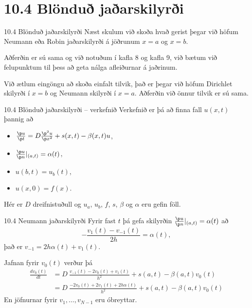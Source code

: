   
  \section*{10.4 Blönduð jaðarskilyrði}
  \begin{frame}{10.4 Blönduð jaðarskilyrði}
   Næst skulum við skoða hvað gerist þegar við höfum Neumann eða
   Robin jaðarskilyrði á jöðrunum $x=a$ og $x=b$.
   \pause
   \medskip
   
   Aðferðin er sú sama og við notuðum í kafla 8 og kafla 9, við bætum
   við felupunktum til þess að geta nálga afleiðurnar á jaðrinum.
   \pause
   \medskip
   
   Við ætlum eingöngu að skoða einfalt tilvik, það er þegar við höfum
   Dirichlet skilyrði í $x=b$ og Neumann skilyrði í $x=a$. 
   Aðferðin við önnur tilvik er sú sama.
  \end{frame}
  
  \begin{frame}{10.4 Blönduð jaðarskilyrði -- verkefnið}
   Verkefnið er þá að finna fall $u(x,t)$ þannig að 
   \begin{itemize}
 \item $\frac{\p u}{\p t} =  D \frac{\p^2 u}{\p x^2} + s(x,t) - \beta(x,t)u$,
 \item $\frac{\p u}{\p n}|_{(a,t)} = \alpha(t)$,
 \item $u(b,t) = u_b(t)$, 
 \item $u(x,0) = f(x)$.
\end{itemize}
Hér er $D$ dreifnistuðull og $u_a$, $u_b$, $f$, $s$, $\beta$ og
$\alpha$ eru gefin föll.
  \end{frame}

  
  \begin{frame}{10.4 Neumann jaðarskilyrði}
  Fyrir fast $t$ þá gefa skilyrðin $\frac{\p u}{\p n}|_{(a,t)} = \alpha(t)$
  að
  $$
    -\frac{v_1(t) - v_{-1}(t)}{2h} = \alpha(t),
  $$ \pause
  það er $v_{-1} = 2h\alpha(t) + v_1(t)$.\pause

  Jafnan fyrir $v_0(t)$ verður þá 
 \begin{align*}
 \frac{d v_0(t)}{d t} 
 &= D\  \frac{v_{-1}(t) -2 v_0(t) + v_{1}(t)}{h^2} + s(a,t) - \beta(a,t)v_0(t) \\
 &= D\  \frac{-2 v_0(t) + 2v_{1}(t) + 2h\alpha(t) }{h^2} + s(a,t) - \beta(a,t)v_0(t) 
 \end{align*}
 \pause
 En jöfnurnar fyrir $v_1,\ldots,v_{N-1}$ eru óbreyttar.
  \end{frame}

